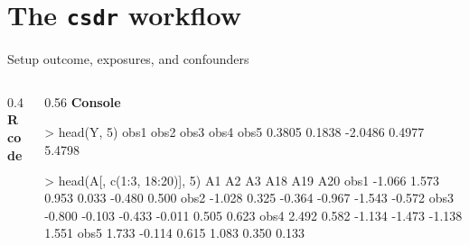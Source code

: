 \documentclass[
  ignorenonframetext,
  aspectratio=169,
  11pt]{beamer}
\newenvironment{Shaded}{\begin{snugshade}}{\end{snugshade}}
\newcommand{\DecValTok}[1]{\textcolor[rgb]{0.68,0.00,0.00}{#1}}
\newcommand{\FunctionTok}[1]{\textcolor[rgb]{0.28,0.35,0.67}{#1}}
\newcommand{\NormalTok}[1]{\textcolor[rgb]{0.00,0.23,0.31}{#1}}
\newcommand{\OtherTok}[1]{\textcolor[rgb]{0.00,0.23,0.31}{#1}}
\newcommand{\SpecialCharTok}[1]{\textcolor[rgb]{0.37,0.37,0.37}{#1}}
\newcommand{\workflowcodefont}{\fontsize{6.3}{7.1}\selectfont}
\newcommand{\method}[1]{%
  \textcolor{emoryblue}{\textbf{#1}}%
}
\begin{document}
\section{\texorpdfstring{The \texttt{csdr}
workflow}{The csdr workflow}}\label{the-csdr-workflow}

\begin{frame}[fragile,t]{Setup outcome, exposures, and confounders}
\label{setup-outcome-exposures-and-confounders}
\begin{columns}[T]
\begin{column}{0.4\linewidth}
\method{R code}

\workflowcodefont

\begin{Shaded}
\end{Shaded}
\end{column}

\begin{column}{0.56\linewidth}
\method{Console}

\workflowcodefont

\begin{Shaded}
\begin{Highlighting}[]
\NormalTok{\textgreater{} head(Y, 5)}
\NormalTok{     obs1      obs2      obs3      obs4      obs5}
\NormalTok{  0.3805    0.1838   {-}2.0486    0.4977    5.4798}

\NormalTok{\textgreater{} head(A[, c(1:3, 18:20)], 5)}
\NormalTok{         A1     A2     A3    A18    A19    A20}
\NormalTok{obs1 {-}1.066  1.573  0.953  0.033 {-}0.480  0.500}
\NormalTok{obs2 {-}1.028  0.325 {-}0.364 {-}0.967 {-}1.543 {-}0.572}
\NormalTok{obs3 {-}0.800 {-}0.103 {-}0.433 {-}0.011  0.505  0.623}
\NormalTok{obs4  2.492  0.582 {-}1.134 {-}1.473 {-}1.138  1.551}
\NormalTok{obs5  1.733 {-}0.114  0.615  1.083  0.350  0.133}


\end{Highlighting}
\end{Shaded}
\end{column}
\end{columns}
\end{frame}
\end{document}

